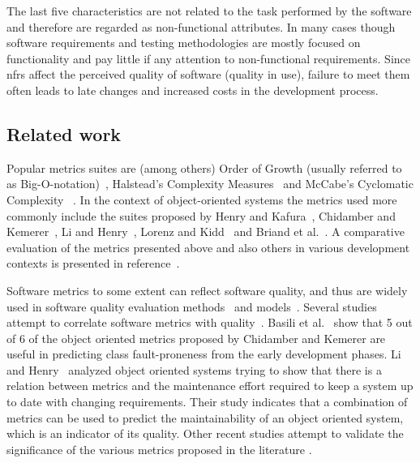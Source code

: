 \documentclass{llncs}
\begin{document}
The last five characteristics are not related to the task performed by the software
and therefore are regarded as non-functional attributes. In many
cases though software requirements and testing methodologies are mostly focused
on functionality and pay little if any attention to non-functional requirements.
Since {\sc nfr}s affect the perceived quality of software (quality in use), failure to
meet them often leads to late changes and increased costs in the development
process.

\subsection{Related work} %
Popular metrics suites are (among others) 
Order of Growth (usually referred to as Big-O-notation)~\cite{CLRS01}, 
Halstead's Complexity Measures~\cite{HAL77} and McCabe's Cyclomatic Complexity
~\cite{MCC76,MCB89,MCW94}. In the context of object-oriented systems the
metrics used more commonly include the suites proposed by Henry and
Kafura~\cite{HEKA81,HEKA84}, Chidamber and Kemerer~\cite{CHKE91,CHKE94}, Li
and Henry~\cite{LIHE93}, Lorenz and Kidd~\cite{LOKI94} and Briand
et al.~\cite{BDM97,BMB99}. A comparative evaluation of the metrics presented 
above and also others in various development contexts is presented 
in reference~\cite{XSZC00}.

Software metrics to some extent can reflect software quality, and thus are
widely used in software quality evaluation methods~\cite{BBL76} and 
models~\cite{BADA02}. Several studies attempt to correlate software metrics
with quality~\cite{SUKR03,KAN02}. Basili et al.~\cite{BBM96} show that 5
out of 6 of the object oriented metrics proposed by Chidamber and Kemerer are
useful in predicting class fault-proneness from the early development phases.
Li and Henry~\cite{LIHE93} analyzed object oriented systems trying to show
that there is a relation between metrics and the maintenance effort required
to keep a system up to date with changing requirements. Their study indicates
that a combination of metrics can be used to predict the maintainability of
an object oriented system, which is an indicator of its quality. Other recent
studies attempt to validate the significance of the various metrics proposed
in the literature \cite{BWDP00}.
\end{document}

